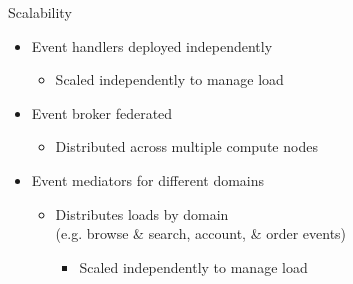\documentclass{slide}
\begin{document}

\begin{frame}{Scalability}
    \vspace{1mm}
    {\LARGE
    \begin{itemize}
        \item Event handlers deployed independently
        \begin{itemize}
            \Large\item Scaled independently to manage load
	\end{itemize}
        \vspace{3mm}
        \item Event broker federated
        \begin{itemize}
            \Large\item Distributed across multiple compute nodes
	\end{itemize}
        \vspace{3mm}
        \item Event mediators for different domains
        \begin{itemize}
            \Large\item Distributes loads by domain\\(e.g. browse \& search, account, \& order events)
            \begin{itemize}
                \item Scaled independently to manage load
            \end{itemize}
	\end{itemize}
    \end{itemize}
    }
\end{frame}
\end{document}
